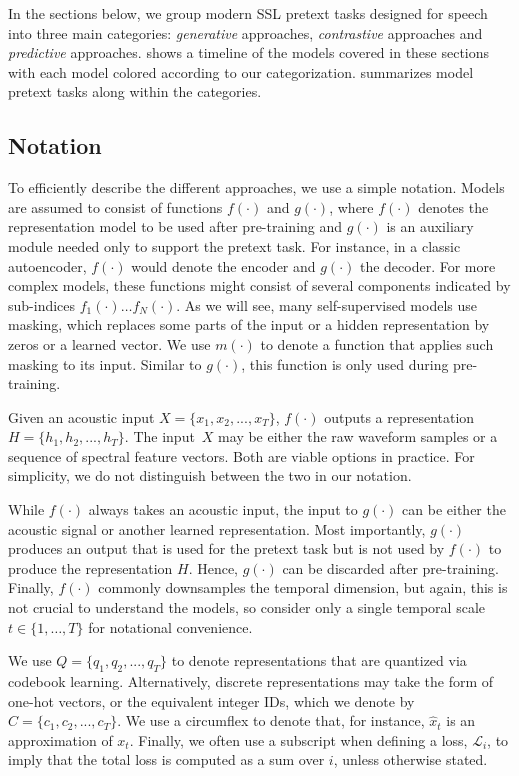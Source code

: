 In the sections below, we group modern SSL pretext tasks designed for speech
into three main categories: \textit{generative} approaches,
\textit{contrastive} approaches and \textit{predictive} approaches. 
 shows a timeline of the models covered in these sections
with each model colored according to our categorization. 
 summarizes model pretext tasks along within the categories.


\subsection{Notation}
\label{sec:notation}

To efficiently describe the different approaches, we use a simple
notation. Models are assumed to consist of functions $f(\cdot)$ and $g(\cdot)$, where $f(\cdot)$  denotes the representation model to be used after pre-training and $g(\cdot)$ is an auxiliary module needed only to support the pretext task. For instance, in a classic autoencoder, $f(\cdot)$ would denote the encoder and $g(\cdot)$ the decoder. For more complex models, these functions might consist of several components indicated by sub-indices $f_1(\cdot) \dots f_N(\cdot)$. As we will see, many self-supervised models use masking, which replaces some parts of the input or a hidden representation  by zeros or a learned vector. We use $m(\cdot)$ to denote a function that applies such masking to its input. Similar to $g(\cdot)$, this function is only used during pre-training. 

Given an acoustic input $X =\{x_1,x_2, ..., x_T\}$, $f(\cdot)$ outputs a representation $H =\{h_1,h_2,...,h_T\}$. The input~$X$ may be either the raw waveform samples or a sequence of spectral feature vectors. Both are viable options in practice. For simplicity, we do not distinguish between the two in our notation.  

While $f(\cdot)$ always takes an acoustic input, the input to $g(\cdot)$ can be either the acoustic signal or another learned representation. Most importantly, $g(\cdot)$ produces an output that is used for the pretext task but is not  used by $f(\cdot)$ to produce the representation $H$. Hence, $g(\cdot)$ can be discarded after pre-training. Finally, $f(\cdot)$ commonly downsamples the temporal dimension, but again, this is not crucial to understand the models, so consider only a single temporal scale $t\in\{1,\dots, T\}$ for notational convenience.

We use $Q = \{q_1,q_2, ..., q_T\}$ to denote representations that are quantized via codebook learning. Alternatively, discrete representations may take the form of one-hot vectors, or the equivalent integer IDs, which we denote by $C = \{c_1,c_2, ..., c_T\}$. We use a circumflex to denote that, for instance, $\hat{x}_t$ is an approximation of $x_t$. Finally, we often use a subscript when defining a loss, $\mathcal{L}_i$, to imply that the total loss is computed as a sum over $i$, unless otherwise stated.

